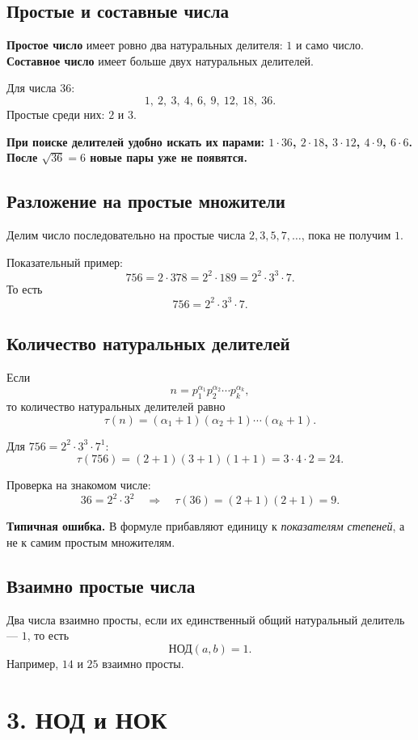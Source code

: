 \documentclass[a4paper,12pt]{article}
\newcommand{\nodtext}{\text{НОД}}
\newcommand{\key}[1]{\textbf{\color{darkaccent}#1}}
\newcommand{\important}[1]{%
  \par\vspace{0.25em}
  \noindent\colorbox{softgray}{\parbox{0.965\linewidth}{\textbf{#1}}}\par\vspace{0.25em}}
\newcommand{\errornote}[1]{%
  \par\vspace{0.2em}
  \noindent\textcolor{warn}{\textbf{Типичная ошибка.}} #1\par}
\begin{document}
\subsection{Простые и составные числа}
\key{Простое число} имеет ровно два натуральных делителя: $1$ и само число.\\
\key{Составное число} имеет больше двух натуральных делителей.

Для числа $36$:
\[
1,\ 2,\ 3,\ 4,\ 6,\ 9,\ 12,\ 18,\ 36.
\]
Простые среди них: $2$ и $3$.

\important{При поиске делителей удобно искать их парами: $1\cdot36$, $2\cdot18$, $3\cdot12$, $4\cdot9$, $6\cdot6$. После $\sqrt{36}=6$ новые пары уже не появятся.}

\subsection{Разложение на простые множители}
Делим число последовательно на простые числа $2,3,5,7,\ldots$, пока не получим $1$.

Показательный пример:
\[
756=2\cdot378=2^2\cdot189=2^2\cdot3^3\cdot7.
\]
То есть
\[
\boxed{756=2^2\cdot3^3\cdot7}.
\]

\subsection{Количество натуральных делителей}
Если
\[
n=p_1^{\alpha_1}p_2^{\alpha_2}\cdots p_k^{\alpha_k},
\]
то количество натуральных делителей равно
\[
\boxed{\tau(n)=(\alpha_1+1)(\alpha_2+1)\cdots(\alpha_k+1)}.
\]

Для $756=2^2\cdot3^3\cdot7^1$:
\[
\tau(756)=(2+1)(3+1)(1+1)=3\cdot4\cdot2=24.
\]

Проверка на знакомом числе:
\[
36=2^2\cdot3^2\quad\Rightarrow\quad \tau(36)=(2+1)(2+1)=9.
\]

\errornote{В формуле прибавляют единицу к \emph{показателям степеней}, а не к самим простым множителям.}

\subsection{Взаимно простые числа}
Два числа взаимно просты, если их единственный общий натуральный делитель --- $1$, то есть
\[
\nodtext(a,b)=1.
\]
Например, $14$ и $25$ взаимно просты.

\section{3. НОД и НОК}
\end{document}

